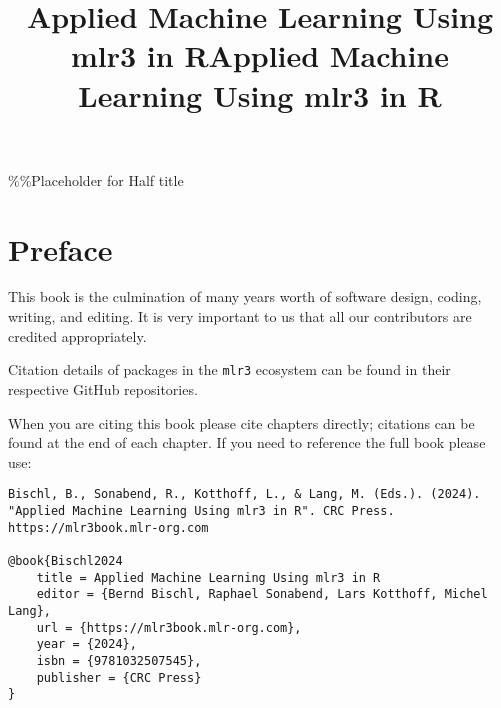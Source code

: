 \documentclass[
  letterpaper,
  krantz2]{krantz}
\title{Applied Machine Learning Using mlr3 in R}
\author{}
\date{}
\begin{document}
\maketitle
\ifdefined\Shaded\renewenvironment{Shaded}{\begin{tcolorbox}[boxrule=0pt, sharp corners, breakable, borderline west={3pt}{0pt}{shadecolor}, frame hidden, enhanced, colback={codebgcolor}]}{\end{tcolorbox}}\fi


\frontmatter

\%\%Placeholder for Half
title


\title{Applied Machine Learning Using mlr3 in R}



\locpage

\cleardoublepage
\setcounter{page}{7}

\tableofcontents

\chapter*{Preface}

This book is the culmination of many years worth of software design,
coding, writing, and editing. It is very important to us that all our
contributors are credited appropriately.

Citation details of packages in the \texttt{mlr3} ecosystem can be found
in their respective GitHub repositories.

When you are citing this book please cite chapters directly; citations
can be found at the end of each chapter. If you need to reference the
full book please use:

\begin{verbatim}
Bischl, B., Sonabend, R., Kotthoff, L., & Lang, M. (Eds.). (2024).
"Applied Machine Learning Using mlr3 in R". CRC Press. https://mlr3book.mlr-org.com

@book{Bischl2024
    title = Applied Machine Learning Using mlr3 in R
    editor = {Bernd Bischl, Raphael Sonabend, Lars Kotthoff, Michel Lang},
    url = {https://mlr3book.mlr-org.com},
    year = {2024},
    isbn = {9781032507545},
    publisher = {CRC Press}
}
\end{verbatim}
\end{document}
